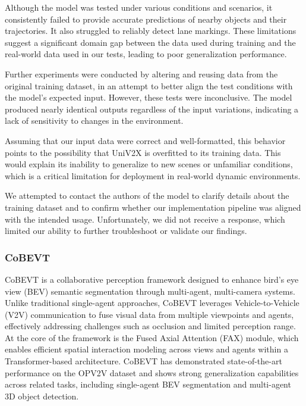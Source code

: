 Although the model was tested under various conditions and scenarios, it consistently failed to provide accurate predictions of nearby objects and their trajectories. 
It also struggled to reliably detect lane markings. These limitations suggest a significant domain gap between the data used during training and the real-world data used in our tests, leading to poor generalization performance.

Further experiments were conducted by altering and reusing data from the original training dataset, in an attempt to better align the test conditions with the model's expected input. 
However, these tests were inconclusive. The model produced nearly identical outputs regardless of the input variations, indicating a lack of sensitivity to changes in the environment.

Assuming that our input data were correct and well-formatted, this behavior points to the possibility that UniV2X is overfitted to its training data. 
This would explain its inability to generalize to new scenes or unfamiliar conditions, which is a critical limitation for deployment in real-world dynamic environments.

We attempted to contact the authors of the model to clarify details about the training dataset and to confirm whether our implementation pipeline was aligned with the intended usage. 
Unfortunately, we did not receive a response, which limited our ability to further troubleshoot or validate our findings.

\subsubsection{CoBEVT}

CoBEVT is a collaborative perception framework designed to enhance bird’s eye view (BEV) semantic segmentation through multi-agent, multi-camera systems. 
Unlike traditional single-agent approaches, CoBEVT leverages Vehicle-to-Vehicle (V2V) communication to fuse visual data from multiple viewpoints and agents, effectively addressing challenges such as occlusion and limited perception range. 
At the core of the framework is the Fused Axial Attention (FAX) module, which enables efficient spatial interaction modeling across views and agents within a Transformer-based architecture. 
CoBEVT has demonstrated state-of-the-art performance on the OPV2V \cite{xu2022cobevtcooperativebirdseye} dataset and shows strong generalization capabilities across related tasks, including single-agent BEV segmentation and multi-agent 3D object detection.

